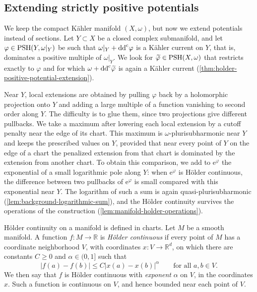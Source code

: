 \subsection{Extending strictly positive potentials}
\label{sec:strict-positive-potential-extension}
We keep the compact K\"ahler manifold $(X,\omega)$, but now we extend potentials instead of sections. Let $Y\subset X$ be a closed complex submanifold, and let $\varphi\in\mathrm{PSH}(Y,\omega|_Y)$ be such that $\omega|_Y+\mathrm{dd}^{\mathrm{c}}\varphi$ is a K\"ahler current on $Y$, that is, dominates a positive multiple of $\omega|_Y$. We look for $\widetilde\varphi\in\mathrm{PSH}(X,\omega)$ that restricts exactly to $\varphi$ and for which $\omega+\mathrm{dd}^{\mathrm{c}}\widetilde\varphi$ is again a K\"ahler current (\cref{thm:holder-positive-potential-extension}).

Near $Y$, local extensions are obtained by pulling $\varphi$ back by a holomorphic projection onto $Y$ and adding a large multiple of a function vanishing to second order along $Y$. The difficulty is to glue them, since two projections give different pullbacks. We take a maximum after lowering each local extension by a cutoff penalty near the edge of its chart. This maximum is $\omega$-plurisubharmonic near $Y$ and keeps the prescribed values on $Y$, provided that near every point of $Y$ on the edge of a chart the penalized extension from that chart is dominated by the extension from another chart. To obtain this comparison, we add to $\mathrm e^\varphi$ the exponential of a small logarithmic pole along $Y$: when $\mathrm e^\varphi$ is H\"older continuous, the difference between two pullbacks of $\mathrm e^\varphi$ is small compared with this exponential near $Y$. The logarithm of such a sum is again quasi-plurisubharmonic (\cref{lem:background-logarithmic-sum}), and the H\"older continuity survives the operations of the construction (\cref{lem:manifold-holder-operations}).

H\"older continuity on a manifold is defined in charts. Let $M$ be a smooth manifold. A function $f\colon M\to\mathbb R$ is \emph{H\"older continuous} if every point of $M$ has a coordinate neighborhood $V$, with coordinates $x\colon V\to\mathbb R^d$, on which there are constants $C\geq0$ and $\alpha\in(0,1]$ such that
\[
 |f(a)-f(b)|\leq C|x(a)-x(b)|^\alpha\qquad\text{for all }a,b\in V.
\]
We then say that $f$ is H\"older continuous with \emph{exponent} $\alpha$ on $V$, in the coordinates $x$. Such a function is continuous on $V$, and hence bounded near each point of $V$.

